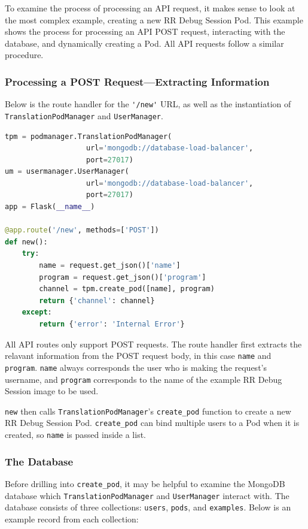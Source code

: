 \documentclass[12pt]{article}
\begin{document}
To examine the process of processing an API request, it makes sense to
look at the most complex example, creating a new RR Debug Session Pod.
This example shows the process for processing an API POST request,
interacting with the database, and dynamically creating a Pod.  All
API requests follow a similar procedure.

\subsubsection{Processing a POST Request---Extracting Information}

Below is the route handler for the \lstinline{'/new'} URL, as well as
the instantiation of \lstinline{TranslationPodManager} and
\lstinline{UserManager}.

\begin{lstlisting}[language=Python,basicstyle=\linespread{0.5}\ttfamily,caption={API Server New RR Debug Session Event Handler},captionpos=b]
tpm = podmanager.TranslationPodManager(
                   url='mongodb://database-load-balancer',
                   port=27017)
um = usermanager.UserManager(
                   url='mongodb://database-load-balancer',
                   port=27017)
app = Flask(__name__)

@app.route('/new', methods=['POST'])
def new():
    try:
        name = request.get_json()['name']
        program = request.get_json()['program']
        channel = tpm.create_pod([name], program)
        return {'channel': channel}
    except:
        return {'error': 'Internal Error'}
\end{lstlisting}

All API routes only support POST requests.  The route handler first
extracts the relavant information from the POST request body, in this
case \lstinline{name} and \lstinline{program}.  \lstinline{name}
always corresponds the user who is making the request's username, and
\lstinline{program} corresponds to the name of the example RR Debug
Session image to be used.
\par

\lstinline{new} then calls \lstinline{TranslationPodManager}'s
\lstinline{create_pod} function to create a new RR Debug Session Pod.
\lstinline{create_pod} can bind multiple users to a Pod when it is
created, so \lstinline{name} is passed inside a list.

\subsubsection{The Database} Before drilling into \lstinline{create_pod},
it may be helpful to examine the MongoDB database which
\lstinline{TranslationPodManager} and \lstinline{UserManager} interact
with.  The database consists of three collections: \lstinline{users},
\lstinline{pods}, and \lstinline{examples}.  Below is an example
record from each collection:
\end{document}
